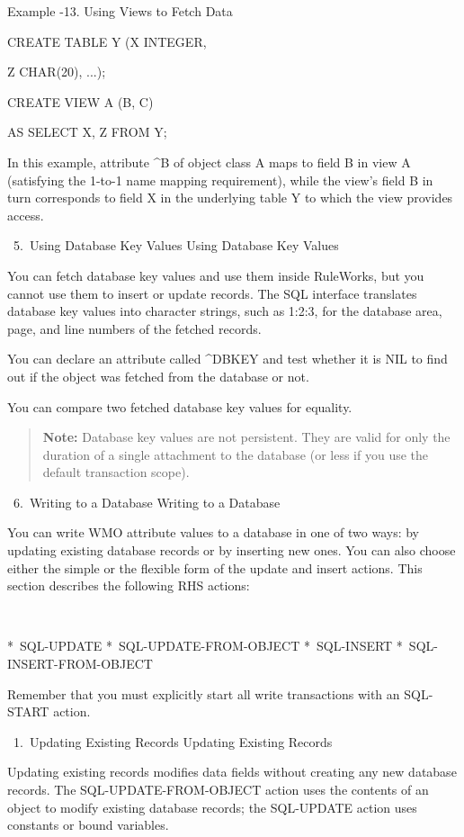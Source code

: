      Example -13. Using Views to Fetch Data

     CREATE TABLE Y (X INTEGER,

     Z CHAR(20), ...);

     CREATE VIEW A (B, C)

     AS SELECT X, Z FROM Y;

     In this example, attribute ^B of object class
     A maps to field B in view A (satisfying the
     1-to-1 name mapping requirement), while the
     view's field B in turn corresponds to field X
     in the underlying table Y to which the view
     provides access.

  5. Using Database Key Values Using Database Key
     Values

     You can fetch database key values and use them
     inside RuleWorks, but you cannot use them to
     insert or update records. The SQL interface
     translates database key values into character
     strings, such as 1:2:3, for the database area,
     page, and line numbers of the fetched records.

     You can declare an attribute called ^DBKEY and
     test whether it is NIL to find out if the
     object was fetched from the database or not.

     You can compare two fetched database key
     values for equality.

\begin{quote}
  \textbf{Note:} Database key values are not persistent.  They are
  valid for only the duration of a single attachment to the database
  (or less if you use the default transaction scope).
\end{quote}

 6. Writing to a Database Writing to a Database

You can write WMO attribute values to a database in
one of two ways: by updating existing database
records or by inserting new ones. You can also
choose either the simple or the flexible form of
the update and insert actions. This section
describes the following RHS actions:

 

  * SQL-UPDATE
  * SQL-UPDATE-FROM-OBJECT
  * SQL-INSERT
  * SQL-INSERT-FROM-OBJECT

Remember that you must explicitly start all write
transactions with an SQL-START action.

   1. Updating Existing Records Updating Existing
      Records

      Updating existing records modifies data
      fields without creating any new database
      records. The SQL-UPDATE-FROM-OBJECT action
      uses the contents of an object to modify
      existing database records; the SQL-UPDATE
      action uses constants or bound variables.

